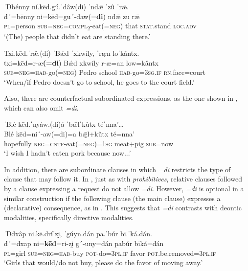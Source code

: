 \documentclass[output=paper,colorlinks=true, citecolor=brown]{langscibook}
\begin{document}
\ea\label{ex:zap:56} 
    \glll ˈDbénny ní.kēd.gú.ˈdâw(di) ˈndǣ ˈzû ˈrǣ.\\ 
          d´=bēnny ni=kēd=gu´-daw(=\textbf{di}) ndǣ zu rǣ\\
          \textsc{pl}=person \textsc{sub}=\textsc{neg}=\textsc{compl}\textsc{\textsubscript{2}}{}-eat(=\textsc{neg}) that \textsc{stat}.stand \textsc{loc.adv}\\
    \glt ‘(The) people that didn’t eat are standing there.’
\z 

\ea\label{ex:zap:57} 
    \glll Txi.kēd.ˈr\^{æ}.(di) ˈBǽd ˈxkwíly, ˈræ̰n loˈkǎntx.\\ 
          txi=kēd=r-æ\textbf{(=di}) Bǽd xkwíly r-æ=an low=kǎntx\\
          \textsc{sub}=\textsc{neg}=\textsc{hab}{}-go(=\textsc{neg}) Pedro school \textsc{hab}{}-go=\textsc{3sg.if} \textsc{rn}.face=court\\
    \glt ‘When/if Pedro doesn’t go to school, he goes to the court field.’
\z 

Also, there are counterfactual subordinated expressions, as the one shown in , which can also omit \textit{=di}. 

\ea\label{ex:zap:58} 
    \glll ˈBlé kēd.ˈnyáw.(di)á ˈbǣlˈkǔtx téˈnna’…\\ 
          Blé kēd=ni´-aw(=di)=a bǣ̰l+kǔtx té=nna’\\
          hopefully \textsc{neg}=\textsc{cntf}{}-eat(=\textsc{neg})=\textsc{1sg} meat+pig \textsc{sub}=now\\
    \glt ‘I wish I hadn’t eaten pork because now...’
\z 

In addition, there are subordinate clauses in which \textit{=di} restricts the type of clause that may follow it. In , just as with \textit{prohibitives}, relative clauses followed by a clause expressing a request do not allow \textit{=di}. However, \textit{=di} is optional in a similar construction if the following clause (the main clause) expresses a (declarative) consequence, as in . This suggests that \textit{=di} contrasts with deontic modalities, specifically directive modalities. 

\ea\label{ex:zap:59} 
    \glll ˈDdxâp ni.kē.dríˈzḭ, ˈgúyn.dán pa.ˈbúr bī.ˈká.dán.\\ 
          d´=dxap ni=\textbf{kēd}=ri-zḭ g´-uny=dán pabúr bīká=dán\\
          \textsc{pl}=girl \textsc{sub}=\textsc{neg}=\textsc{hab}{}-buy \textsc{pot}{}-do=\textsc{3pl.if} favor \textsc{pot.}be.removed=\textsc{3pl.if}\\
    \glt ‘Girls that would/do not buy, please do the favor of moving away.’
\z 
\end{document}
